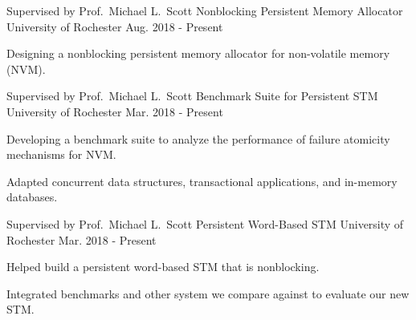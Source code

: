 

\begin{cventries}

  \cventry
    {Supervised by Prof.\ Michael L.\ Scott} %
    {Nonblocking Persistent Memory Allocator} %
    {University of Rochester} %
    {Aug. 2018 - Present} %
    {
      \begin{cvitems} %
        \item {Designing a nonblocking persistent memory allocator for non-volatile memory (NVM).}
      \end{cvitems}
	}

  \cventry
    {Supervised by Prof.\ Michael L.\ Scott} %
    {Benchmark Suite for Persistent STM} %
    {University of Rochester} %
    {Mar. 2018 - Present} %
    {
      \begin{cvitems} %
        \item {Developing a benchmark suite to analyze the performance of failure atomicity mechanisms for NVM.}
        \item {Adapted concurrent data structures, transactional applications, and in-memory databases.}
      \end{cvitems}
    }

  \cventry
    {Supervised by Prof.\ Michael L.\ Scott} %
    {Persistent Word-Based STM} %
    {University of Rochester} %
    {Mar. 2018 - Present} %
    {
      \begin{cvitems} %
        \item {Helped build a persistent word-based STM that is nonblocking.}
        \item {Integrated benchmarks and other system we compare against to evaluate our new STM.}
      \end{cvitems}
    }


\end{cventries}
